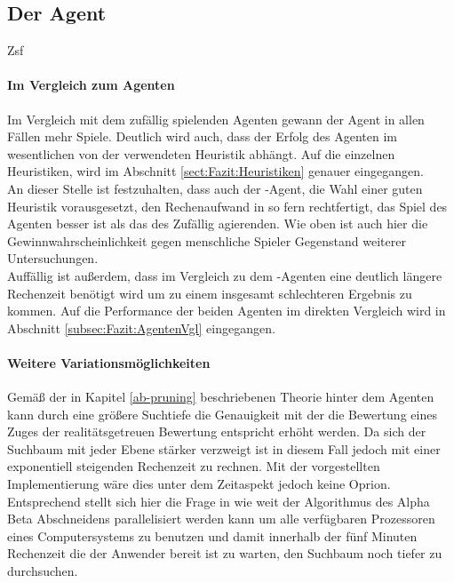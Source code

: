 \subsection{Der Agent }
Zsf 
\paragraph{Im Vergleich zum Agenten }
Im Vergleich mit dem zufällig spielenden Agenten gewann der Agent  in allen  Fällen mehr Spiele. Deutlich wird auch, dass der Erfolg des Agenten im wesentlichen von der verwendeten Heuristik abhängt. Auf die einzelnen Heuristiken, wird im Abschnitt \ref{sect:Fazit:Heuristiken} genauer eingegangen.
\\An dieser Stelle ist festzuhalten, dass auch der -Agent, die Wahl einer guten Heuristik vorausgesetzt, den Rechenaufwand in so fern rechtfertigt, das Spiel des Agenten besser ist als das des Zufällig agierenden. Wie oben ist auch hier die Gewinnwahrscheinlichkeit gegen menschliche Spieler Gegenstand weiterer Untersuchungen.
\\Auffällig ist außerdem, dass im Vergleich zu dem -Agenten eine deutlich längere Rechenzeit benötigt wird um zu einem insgesamt schlechteren Ergebnis zu kommen. Auf die Performance der beiden Agenten im direkten Vergleich wird in Abschnitt \ref{subsec:Fazit:AgentenVgl} eingegangen.
\paragraph{Weitere Variationsmöglichkeiten}
Gemäß der in Kapitel \ref{ab-pruning} beschriebenen Theorie hinter dem Agenten  kann durch eine größere Suchtiefe  die Genauigkeit mit der die Bewertung eines Zuges der realitätsgetreuen Bewertung entspricht erhöht werden. Da sich der Suchbaum mit jeder Ebene stärker verzweigt ist in diesem Fall jedoch mit einer exponentiell steigenden Rechenzeit zu rechnen. Mit der vorgestellten Implementierung wäre dies unter dem Zeitaspekt jedoch keine Oprion. Entsprechend stellt sich hier die Frage in wie weit der Algorithmus des Alpha Beta Abschneidens parallelisiert werden kann um alle verfügbaren Prozessoren eines Computersystems zu benutzen und damit innerhalb der fünf Minuten Rechenzeit die der Anwender bereit ist zu warten, den Suchbaum noch tiefer zu durchsuchen.


